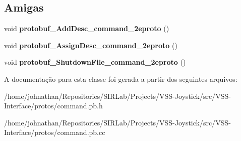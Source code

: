 \subsection*{Amigas}
\begin{DoxyCompactItemize}
\item 
void {\bfseries protobuf\+\_\+\+Add\+Desc\+\_\+command\+\_\+2eproto} ()\hypertarget{classvss__command_1_1Global__Commands_a4825d92f856fcb4b02c67b601c433796}{}\label{classvss__command_1_1Global__Commands_a4825d92f856fcb4b02c67b601c433796}

\item 
void {\bfseries protobuf\+\_\+\+Assign\+Desc\+\_\+command\+\_\+2eproto} ()\hypertarget{classvss__command_1_1Global__Commands_a4c6fb97c25079d49daf010087d869100}{}\label{classvss__command_1_1Global__Commands_a4c6fb97c25079d49daf010087d869100}

\item 
void {\bfseries protobuf\+\_\+\+Shutdown\+File\+\_\+command\+\_\+2eproto} ()\hypertarget{classvss__command_1_1Global__Commands_a4cf10633ad46690f5eec6bdbbcf62de0}{}\label{classvss__command_1_1Global__Commands_a4cf10633ad46690f5eec6bdbbcf62de0}

\end{DoxyCompactItemize}


A documentação para esta classe foi gerada a partir dos seguintes arquivos\+:\begin{DoxyCompactItemize}
\item 
/home/johnathan/\+Repositories/\+S\+I\+R\+Lab/\+Projects/\+V\+S\+S-\/\+Joystick/src/\+V\+S\+S-\/\+Interface/protos/command.\+pb.\+h\item 
/home/johnathan/\+Repositories/\+S\+I\+R\+Lab/\+Projects/\+V\+S\+S-\/\+Joystick/src/\+V\+S\+S-\/\+Interface/protos/command.\+pb.\+cc\end{DoxyCompactItemize}
